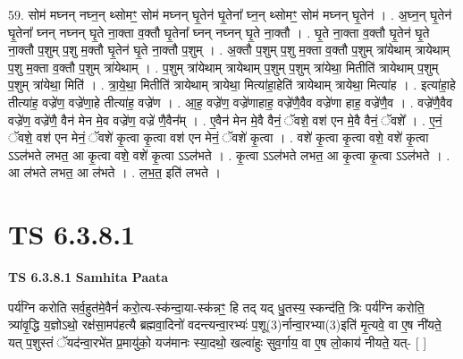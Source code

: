 \documentclass[17pt]{extarticle}
\begin{document}
59. सोम॑ मघ्नन् नघ्न॒न् थ्सोमꣳ॒॒ सोम॑ मघ्नन् घृ॒तेन॑ घृ॒तेना᳚ घ्न॒न् थ्सोमꣳ॒॒ सोम॑ मघ्नन् घृ॒तेन॑ । . अ॒घ्न॒न् घृ॒तेन॑ घृ॒तेना᳚ घ्नन् नघ्नन् घृ॒ते ना॒क्ता व॒क्तौ घृ॒तेना᳚ घ्नन् नघ्नन् घृ॒ते ना॒क्तौ । . घृ॒ते ना॒क्ता व॒क्तौ घृ॒तेन॑ घृ॒ते ना॒क्तौ प॒शुम् प॒शु म॒क्तौ घृ॒तेन॑ घृ॒ते ना॒क्तौ प॒शुम् । . अ॒क्तौ प॒शुम् प॒शु म॒क्ता व॒क्तौ प॒शुम् त्रा॑येथाम् त्रायेथाम् प॒शु म॒क्ता व॒क्तौ प॒शुम् त्रा॑येथाम् । . प॒शुम् त्रा॑येथाम् त्रायेथाम् प॒शुम् प॒शुम् त्रा॑येथा॒ मितीति॑ त्रायेथाम् प॒शुम् प॒शुम् त्रा॑येथा॒ मिति॑ । . त्रा॒ये॒था॒ मितीति॑ त्रायेथाम् त्रायेथा॒ मित्या॑हा॒हेति॑ त्रायेथाम् त्रायेथा॒ मित्या॑ह । . इत्या॑हा॒हे तीत्या॑ह॒ वज्रे॑ण॒ वज्रे॑णा॒हे तीत्या॑ह॒ वज्रे॑ण । . आ॒ह॒ वज्रे॑ण॒ वज्रे॑णाहाह॒ वज्रे॑णै॒वैव वज्रे॑णा हाह॒ वज्रे॑णै॒व । . वज्रे॑णै॒वैव वज्रे॑ण॒ वज्रे॑णै॒ वैन॑ मेन मे॒व वज्रे॑ण॒ वज्रे॑ णै॒वैन᳚म् । . ए॒वैन॑ मेन मे॒वै वैनं॒ ॅवशे॒ वश॑ एन मे॒वै वैनं॒ ॅवशे᳚ । . ए॒नं॒ ॅवशे॒ वश॑ एन मेनं॒ ॅवशे॑ कृ॒त्वा कृ॒त्वा वश॑ एन मेनं॒ ॅवशे॑ कृ॒त्वा । . वशे॑ कृ॒त्वा कृ॒त्वा वशे॒ वशे॑ कृ॒त्वा ऽऽल॑भते लभत॒ आ कृ॒त्वा वशे॒ वशे॑ कृ॒त्वा ऽऽल॑भते । . कृ॒त्वा ऽऽल॑भते लभत॒ आ कृ॒त्वा कृ॒त्वा ऽऽल॑भते । . आ ल॑भते लभत॒ आ ल॑भते । . ल॒भ॒त॒ इति॑ लभते । \newline
\pagebreak
{}

\section{ TS 6.3.8.1 }

\textbf{TS 6.3.8.1 } \newline
\textbf{Samhita Paata} \newline

पर्य॑ग्नि करोति सर्व॒हुत॑मे॒वैनं॑ करो॒त्य-स्क॑न्दा॒या-स्क॑न्नꣳ॒॒ हि तद् यद् धु॒तस्य॒ स्कन्द॑ति॒ त्रिः पर्य॑ग्नि करोति॒ त्र्या॑वृ॒द्धि य॒ज्ञोऽथो॒ रक्ष॑सा॒मप॑हत्यै ब्रह्मवा॒दिनो॑ वदन्त्यन्वा॒रभ्यः॑ प॒शू(3)र्नान्वा॒रभ्या(3)इति॑ मृ॒त्यवे॒ वा ए॒ष नी॑यते॒ यत् प॒शुस्तं ॅयद॑न्वा॒रभे॑त प्र॒मायु॑को॒ यज॑मानः स्या॒दथो॒ खल्वा॑हुः सुव॒र्गाय॒ वा ए॒ष लो॒काय॑ नीयते॒ यत्- [  ] \newline
\end{document}
